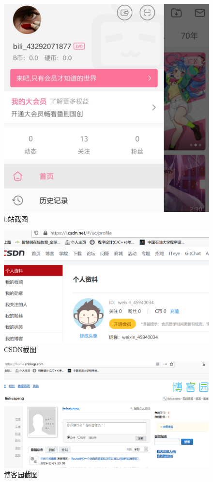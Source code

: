 \documentclass{article}
\begin{document}
\begin{figure}[h!]
	\centering
	\includegraphics[scale=0.3]{Screenshot_20191127-224336}
	\caption{b站截图}
	\label{fig:ggwrqc.jpg}
\end{figure}

\begin{figure}[h!]
	\centering
	\includegraphics[scale=0.4]{20191127233303}
	\caption{CSDN截图}
	\label{fig:ggwrq.jpg}
\end{figure}

\begin{figure}[h!]
	\centering
	\includegraphics[scale=0.4]{20191127233345}
	\caption{博客园截图}
	\label{fig:ggwrqgc.jpg}
\end{figure}
\end{document}
